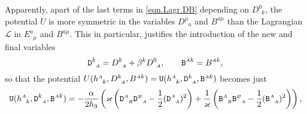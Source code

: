 \documentclass[
10pt, %
a4paper, %
oneside, %
headinclude,footinclude, %
BCOR5mm, %
]{scrartcl}
\newcommand{\sA}{\mathsmaller A}
\newcommand{\sB}{\mathsmaller B}
\newcommand{\sC}{\mathsmaller C}
\newcommand{\sD}{\mathsmaller D}
\newcommand{\mg}[1]{\kappa_{#1}}			%
\newcommand{\tetrsymbol}{h}
\newcommand{\tetr}[2]{\tetrsymbol^{#1}_{\phantom{#1}#2}}
\newcommand{\detTetr}{\tetrsymbol}
\newcommand{\ET}[2]{E^{#1}_{\phantom{#1}#2}}	%
\newcommand{\Dm}[2]{D_{\phantom{#2}#1}^{#2}}	%
\newcommand{\Dfin}[2]{\mathtt{D}_{\phantom{#2}#1}^{#2}}	%
\newcommand{\Ufin}{\mathtt{U}}
\newcommand{\BT}[2]{B^{#1#2}}	%
\newcommand{\Bm}[2]{B^{#1#2}}	%
\newcommand{\Bfin}[2]{\mathtt{B}^{#1#2}}	%
\newcommand{\Bfinmix}[2]{\mathtt{B}^{#1}_{\phantom{#1}#2}}	%
\newcommand{\LagBE}{\mathcal{L}}%
\newcommand{\Um}{U}%
\begin{document}
Apparently, apart of the last terms in \eqref{eqn.Lagr.DB} depending on $ \Dm{k}{0} $, the potential 
$ \Um $ is more symmetric in the variables $ \Dm{a}{\mu} $ and $ 
\Bm{a}{\mu} $ than the Lagrangian $ \LagBE $ in $ \ET{a}{\mu} $ and $ \BT{a}{\mu} $. This in 
particular, justifies the introduction of the new and final variables 
\begin{equation}\label{eqn.db}
	\Dfin{\sA}{k} = \Dm{\sA}{k} + \beta^k \Dm{\sA}{0}, \qquad \Bfin{\sA}{k} = \Bm{\sA}{k},
\end{equation}
so that the potential $ \Um(\tetr{\sA}{k},\Dm{\sA}{k},\Bm{\sA}{k}) = 
\Ufin(\tetr{\sA}{k},\Dfin{\sA}{k},\Bfin{\sA}{k})$ becomes just
	\begin{equation}\label{eqn.Ufin}
		\Ufin(\tetr{\sA}{k},\Dfin{\sA}{k},\Bfin{\sA}{k}) = 
		-\frac{\alpha}{2\detTetr_3} \left( 
		\varkappa \left( \Dfin{\sB}{\sA} \Dfin{\sA}{\sB} - \frac{1}{2} (\Dfin{\sA}{\sA})^2\right)
		+
		\frac{1}{\varkappa} \left( \Bfinmix{\sA}{\sB} \Bfinmix{\sB}{\sA} - \frac{1}{2} 
		(\Bfinmix{\sA}{\sA})^2
		\right)
		\right),
	\end{equation}
%	
\end{document}
